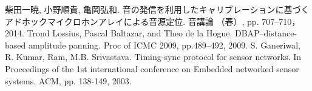 \documentclass[11pt]{jarticle}
\begin{document}
\begin{thebibliography}{10}

 柴田一暁, 小野順貴, 亀岡弘和. 音の発信を利用したキャリブレーションに基づくアドホックマイクロホンアレイによる音源定位. 音講論 （春）, pp. 707--710，2014.
      Trond Lossius, Pascal Baltazar, and Theo de la Hogue. DBAP–distance-based amplitude panning. Proc of ICMC 2009, pp.489--492, 2009.
      S. Ganeriwal, R. Kumar, Ram, M.B. Srivastava. Timing-sync protocol for sensor networks. In Proceedings of the 1st international conference on Embedded networked sensor systems. ACM,  pp. 138-149, 2003.

\end{thebibliography}
\end{document}
